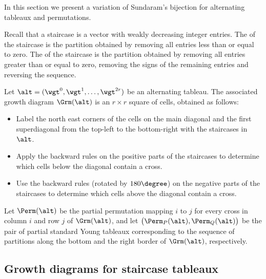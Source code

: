 In this section we present a variation of Sundaram's bijection for
alternating tableaux and permutations.

Recall that a staircase is a vector with weakly decreasing integer
entries. The  of the staircase is the partition
obtained by removing all entries less than or equal to zero. The
 of the staircase is the partition obtained by
removing all entries greater than or equal to zero, removing the
signs of the remaining entries and reversing the sequence.
\begin{defi}\label{defn:P}
 Let $\alt=(\wgt^0,\wgt^1,\ldots,\wgt^{2r})$ be an alternating
 tableau. The associated growth diagram $\Grm(\alt)$ is an
 $r\times r$ square of cells, obtained as follows:
 \begin{itemize}\setlength{\itemsep}{0pt}
 \item[P1] Label the north east corners of the cells on the main diagonal and
 the first superdiagonal from the top-left to the bottom-right
 with the staircases in $\alt$.
 \item[P2] Apply the backward rules on the positive parts of the
 staircases to determine which cells below the diagonal contain a
 cross.
 \item[P3] Use the backward rules (rotated by $180\degree$) on the
 negative parts of the staircases to determine which cells above
 the diagonal contain a cross.
 \end{itemize}

 Let $\Perm(\alt)$ be the partial permutation mapping $i$ to $j$ for
 every cross in column $i$ and row $j$ of $\Grm(\alt)$, and let
 $\big(\Perm_P(\alt), \Perm_Q(\alt)\big)$ be the pair of partial
 standard Young tableaux corresponding to the sequence of partitions
 along the bottom and the right border of $\Grm(\alt)$, respectively.
\end{defi}

\subsection{Growth diagrams for staircase tableaux}

